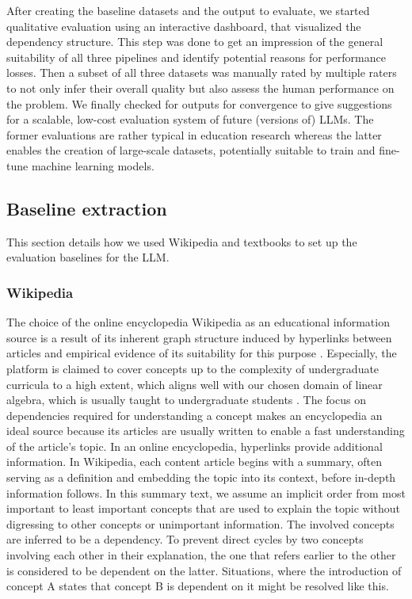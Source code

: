 \documentclass{article}
\begin{document}
After creating the baseline datasets and the output to evaluate, we started qualitative evaluation using an interactive dashboard, that visualized the dependency structure. This step was done to get an impression of the general suitability of all three pipelines and identify potential reasons for performance losses. Then a subset of all three datasets was manually rated by multiple raters to not only infer their overall quality but also assess the human performance on the problem. We finally checked for outputs for convergence to give suggestions for a scalable, low-cost evaluation system of future (versions of) LLMs. The former evaluations are rather typical in education research whereas the latter enables the creation of large-scale datasets, potentially suitable to train and fine-tune machine learning models.

\subsection{Baseline extraction}
This section details how we used Wikipedia and textbooks to set up the evaluation baselines for the LLM.

\subsubsection{Wikipedia}
The choice of the online encyclopedia Wikipedia as an educational information source is a result of its inherent graph structure induced by hyperlinks between articles and empirical evidence of its suitability for this purpose \citep{wang2016prerequisite}.
Especially, the platform is claimed to cover concepts up to the complexity of undergraduate curricula to a high extent, which aligns well with our chosen domain of linear algebra, which is usually taught to undergraduate students \citep{yang2015concept}. The focus on dependencies required for understanding a concept makes an encyclopedia an ideal source because its articles are usually written to enable a fast understanding of the article's topic. In an online encyclopedia, hyperlinks provide additional information. In Wikipedia, each content article begins with a summary, often serving as a definition and embedding the topic into its context, before in-depth information follows. In this summary text, we assume an implicit order from most important to least important concepts that are used to explain the topic without digressing to other concepts or unimportant information. The involved concepts are inferred to be a dependency. To prevent direct cycles by two concepts involving each other in their explanation, the one that refers earlier to the other is considered to be dependent on the latter. Situations, where the introduction of concept A states that concept B is dependent on it might be resolved like this.
\end{document}
